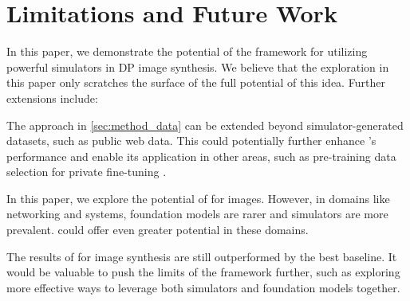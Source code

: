 \section{Limitations and Future Work}

In this paper, we demonstrate the potential of the \pe{} framework for utilizing powerful simulators in DP image synthesis. We believe that the exploration in this paper only scratches the surface of the full potential of this idea. Further extensions include:

\begin{packeditemize}
    \item The approach in \cref{sec:method_data} can be extended beyond simulator-generated datasets, such as public web data. This could potentially further enhance \pe{}'s performance and enable its application in other areas, such as pre-training data selection for private fine-tuning \cite{yu2023selective,li2023privimage}.
    \item In this paper, we explore the potential of \simpe{} for images. However, in domains like networking and systems, foundation models are rarer and simulators are more prevalent. \simpe{} could offer even greater potential in these domains.
    \item The results of \simpe{} for image synthesis are still outperformed by the best baseline. It would be valuable to push the limits of the \pe{} framework further, such as exploring more effective ways to leverage both simulators and foundation models together.
\end{packeditemize}
